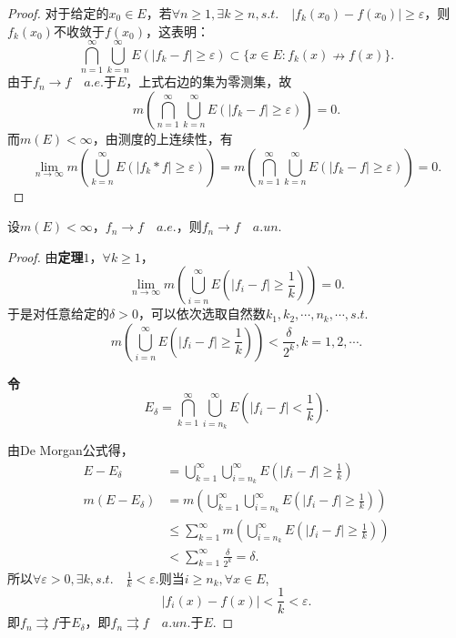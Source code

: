\documentclass[bwprint, withoutpreface]{cumcmthesis}
\begin{document}
\begin{proof}
	对于给定的$x_0 \in E$，若$\forall n \geqslant 1, \exists k \geqslant n, s.t. \quad |f_k(x_0) - f(x_0)| \geqslant \varepsilon$，则$f_k(x_0)$不收敛于$f(x_0)$，这表明：
	\begin{equation*}
		\bigcap_{n = 1}^{\infty}{\bigcup_{k = n}^{\infty}{E(|f_k - f| \geqslant \varepsilon)}} \subset \{x \in E: f_k(x) \nrightarrow f(x)\}.
	\end{equation*}
	由于$f_n \to f \quad a.e. \mbox{于}E$，上式右边的集为零测集，故
	\begin{equation*}
		m(\bigcap_{n = 1}^{\infty}{\bigcup_{k = n}^{\infty}{E(|f_k - f| \geqslant \varepsilon)}}) = 0.
	\end{equation*}
	而$m(E) < \infty$，由测度的上连续性，有
	\begin{equation*}
		\lim_{n \to \infty} m(\bigcup_{k = n}^{\infty}{E(|f_k * f| \geqslant \varepsilon)}) = m(\bigcap_{n = 1}^{\infty}{\bigcup_{k = n}^{\infty}{E(|f_k - f| \geqslant \varepsilon)}}) = 0.
	\end{equation*}
\end{proof}

\begin{theorem}[Egoroff定理]
	设$m(E) < \infty$，$f_n \to f \quad a.e.$，则$f_n \to f \quad a.un.$
\end{theorem}

\begin{proof}
	由\textbf{定理$1$}，$\forall k \geqslant 1$，
	\begin{equation*}
		\lim_{n \to \infty}{m(\bigcup_{i = n}^{\infty}{E(|f_i - f| \geqslant \frac{1}{k})})} = 0.	
	\end{equation*}
	于是对任意给定的$\delta > 0$，可以依次选取自然数$k_1, k_2, \cdots, n_k, \cdots, s.t.$
	\begin{equation*}
		m(\bigcup_{i = n}^{\infty}{E(|f_i - f| \geqslant \frac{1}{k})}) < \frac{\delta}{2^k}, k = 1, 2, \cdots.
	\end{equation*}
	
	\textbf{令\[E_{\delta} = \bigcap_{k = 1}^{\infty}{\bigcup_{i = n_k}^{\infty}{E(|f_i - f| < \frac{1}{k})}}.\]}
	
	由De Morgan公式得，
	\begin{align*}
		E - E_{\delta} & = \bigcup_{k = 1}^{\infty}{\bigcup_{i = n_k}^{\infty}{E(|f_i - f| \geqslant \frac{1}{k})}} \\
		m(E - E_{\delta}) & = m(\bigcup_{k = 1}^{\infty}{\bigcup_{i = n_k}^{\infty}{E(|f_i - f| \geqslant \frac{1}{k})}}) \\
						  & \leqslant \sum_{k = 1}^{\infty}{m(\bigcup_{i = n_k}^{\infty}{E(|f_i - f| \geqslant \frac{1}{k})})} \\
						  & < \sum_{k = 1}^{\infty}{\frac{\delta}{2^k}} = \delta. 
	\end{align*}
	所以$\forall \varepsilon > 0, \exists k, s.t. \quad \frac{1}{k} < \varepsilon$.则当$i \geqslant n_k, \forall x \in E$,
	\begin{equation*}
		|f_i(x) - f(x)| < \frac{1}{k} < \varepsilon.
	\end{equation*}
	即$f_n \rightrightarrows f$于$E_{\delta}$，即$f_n \rightrightarrows f \quad a.un.\mbox{于}E$.
\end{proof}
\end{document}
